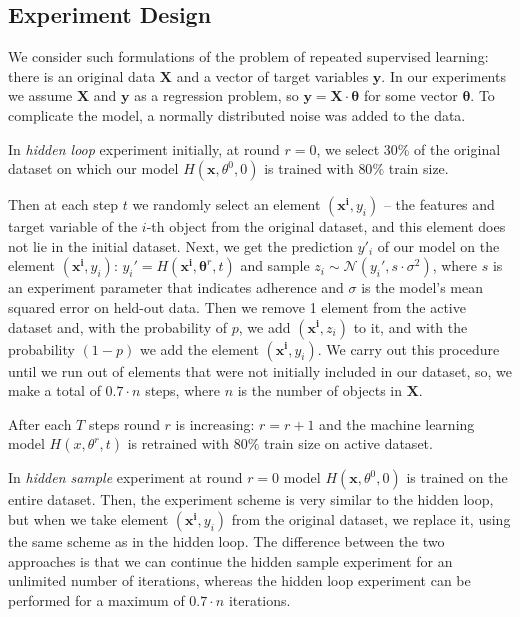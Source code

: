 \documentclass{article}
\begin{document}
    \subsection{Experiment Design} \label{design}
        We consider \footnotemark such formulations of the problem of repeated supervised learning: there is an original data $\textbf{X}$ and a vector of target variables $\mathbf{y}$. In our experiments we assume $\mathbf{X}$ and $\mathbf{y}$ as a regression problem, so $\mathbf{y} = \mathbf{X}  \cdot \mathbf{\theta}$ for some vector $\mathbf{\theta}$. To complicate the model, a normally distributed noise was added to the data.
        
        In \textit{hidden loop} experiment \cite{khritankov2021hidden} initially, at round $r = 0$, we select $30\%$ of the original dataset on which our model $H(\mathbf{x}, \theta^0, 0)$ is trained with $80\%$ train size. 

        
        Then at each step $t$ we randomly select an element $(\mathbf{x^i}, y_i)$ -- the features and target variable of the $i$-th object from the original dataset, and this element does not lie in the initial dataset. Next, we get the prediction $y'_i$ of our model on the element $(\mathbf{x^i}, y_i)$: $y_i'=H(\mathbf{x^i}, \mathbf{\theta}^r, t)$ and sample $z_i \sim \mathcal{N}(y_i', s \cdot \sigma^2)$, where $s$ is an experiment parameter that indicates adherence and $\sigma$ is the model's mean squared error on held-out data. Then we remove 1 element from the active dataset and, with the probability of $p$, we add $(\mathbf{x^i}, z_i)$ to it, and with the probability $(1-p)$ we add the element $(\mathbf{x^i}, y_i)$. We carry out this procedure until we run out of elements that were not initially included in our dataset, so, we make a total of $0.7 \cdot n$ steps, where $n$ is the number of objects in $\textbf{X}$.

        After each $T$ steps round $r$ is increasing: $r = r+1$ and the machine learning model $H(x, \theta^r, t)$ is retrained with $80\%$ train size on active dataset.

        In \textit{hidden sample} experiment at round $r = 0$ model $H(\mathbf{x}, \theta^0, 0)$ is trained on the entire dataset. Then, the experiment scheme is very similar to the hidden loop, but when we take element $(\mathbf{x^i}, y_i)$ from the original dataset, we replace it, using the same scheme as in the hidden loop. The difference between the two approaches is that we can continue the hidden sample experiment for an unlimited number of iterations, whereas the hidden loop experiment can be performed for a maximum of $0.7 \cdot n$ iterations. 
\end{document}
